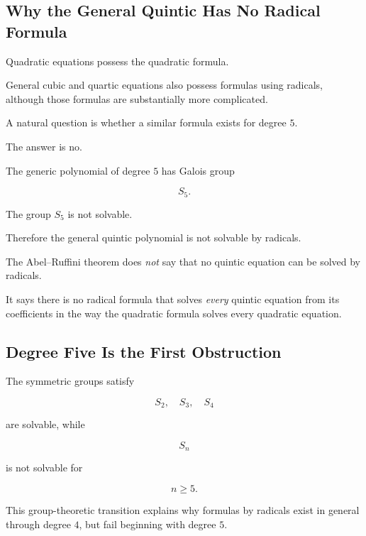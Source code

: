 \subsection{Why the General Quintic Has No Radical Formula}
\label{subsec:general-quintic}

Quadratic equations possess the quadratic formula.

General cubic and quartic equations also possess formulas using radicals,
although those formulas are substantially more complicated.

A natural question is whether a similar formula exists for degree \(5\).

The answer is no.

The generic polynomial of degree \(5\) has Galois group

\[ S_5. \]

The group \(S_5\) is not solvable.

Therefore the general quintic polynomial is not solvable by radicals.

\begin{importantbox}
The Abel--Ruffini theorem does \emph{not} say that no quintic equation can be
solved by radicals.

It says there is no radical formula that solves \emph{every} quintic
equation from its coefficients in the way the quadratic formula solves every
quadratic equation.
\end{importantbox}

\subsection{Degree Five Is the First Obstruction}
\label{subsec:degree-five-obstruction}

The symmetric groups satisfy

\[ S_2,\quad S_3,\quad S_4 \]

are solvable, while

\[ S_n \]

is not solvable for

\[ n\geq5. \]

This group-theoretic transition explains why formulas by radicals exist in
general through degree \(4\), but fail beginning with degree \(5\).

